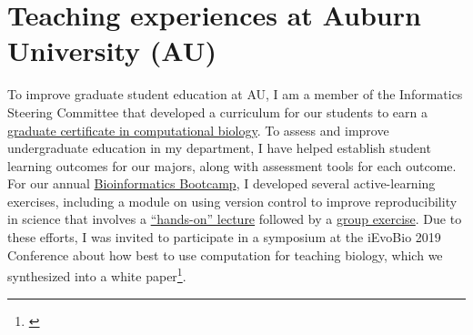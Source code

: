 
\section*{Teaching experiences at Auburn University (AU)}
To improve graduate student education at AU,
I am a member of the Informatics Steering Committee that developed a
curriculum for our students to earn a
\href{http://bulletin.auburn.edu/thegraduateschool/graduatedegreesoffered/biologicalsciencesmsphd_major/computationalbiology_gradcert/}{graduate certificate in computational biology}.
To assess and improve undergraduate education in my department, I have helped
establish student learning outcomes for our majors, along with assessment tools
for each outcome.
For our annual
\href{http://www.auburn.edu/cosam/bioinformatics/}{Bioinformatics Bootcamp},
I developed several active-learning exercises,
including a module on using version control to improve reproducibility in
science that involves a
\href{http://phyletica.org/slides/git-intro/}{``hands-on'' lecture}
followed by a
\href{https://github.com/joaks1/au-bootcamp-git-intro}{group exercise}.
Due to these efforts, I was invited to participate in a symposium at the
iEvoBio 2019 Conference about how best to use computation for teaching biology,
which we synthesized into a
white paper\footnote{\label{ievobiopaper}}.

